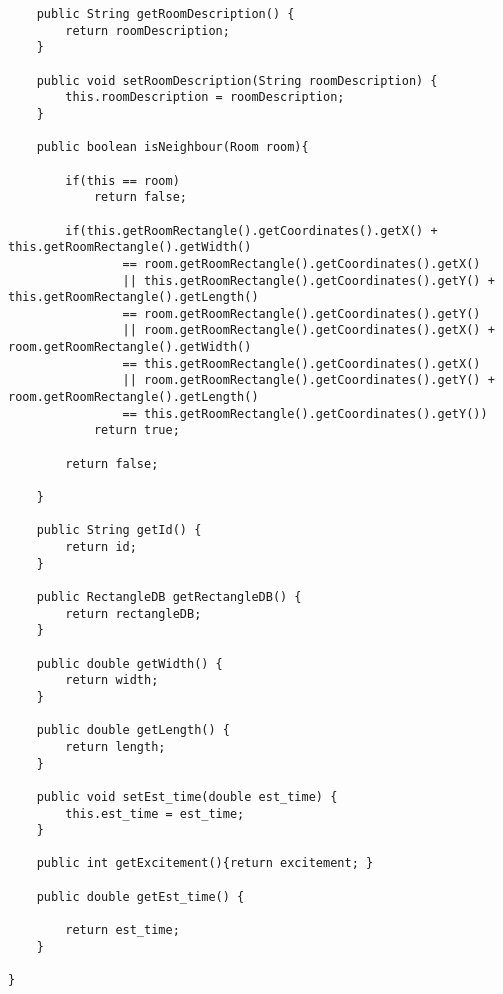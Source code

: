 \begin{lstlisting}
    public String getRoomDescription() {
        return roomDescription;
    }

    public void setRoomDescription(String roomDescription) {
        this.roomDescription = roomDescription;
    }

    public boolean isNeighbour(Room room){

        if(this == room)
            return false;

        if(this.getRoomRectangle().getCoordinates().getX() + this.getRoomRectangle().getWidth()
                == room.getRoomRectangle().getCoordinates().getX()
                || this.getRoomRectangle().getCoordinates().getY() + this.getRoomRectangle().getLength()
                == room.getRoomRectangle().getCoordinates().getY()
                || room.getRoomRectangle().getCoordinates().getX() + room.getRoomRectangle().getWidth()
                == this.getRoomRectangle().getCoordinates().getX()
                || room.getRoomRectangle().getCoordinates().getY() + room.getRoomRectangle().getLength()
                == this.getRoomRectangle().getCoordinates().getY())
            return true;

        return false;

    }

    public String getId() {
        return id;
    }

    public RectangleDB getRectangleDB() {
        return rectangleDB;
    }

    public double getWidth() {
        return width;
    }

    public double getLength() {
        return length;
    }

    public void setEst_time(double est_time) {
        this.est_time = est_time;
    }

    public int getExcitement(){return excitement; }

    public double getEst_time() {

        return est_time;
    }

}
\end{lstlisting}
\newpage
